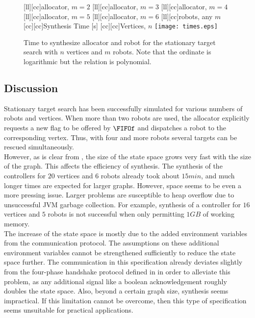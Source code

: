 \begin{figure}
\centering
	[ll][cc]{\footnotesize{allocator, $m=2$}}
	[ll][cc]{\footnotesize{allocator, $m=3$}}
	[ll][cc]{\footnotesize{allocator, $m=4$}}
	[ll][cc]{\footnotesize{allocator, $m=5$}}
	[ll][cc]{\footnotesize{allocator, $m=6$}}
	[ll][cc]{\footnotesize{robots, any $m$}}
	[cc][cc]{\footnotesize{Synthesis Time [s]}}
	[cc][cc]{\footnotesize{Vertices, $n$}}
	\texttt{[image: times.eps]}
\caption{Time to synthesize allocator and robot for the stationary target search with $n$ vertices and $m$ robots. Note that the ordinate is logarithmic but the relation is polynomial.}
\label{fig:stattime}
\end{figure}





\subsection{Discussion}

Stationary target search has been successfully simulated for various numbers of robots and vertices. When more than two robots are used, the allocator explicitly requests a new flag to be offered by $\FIFOf$ and dispatches a robot to the corresponding vertex. Thus, with four and more robots several targets can be rescued simultaneously.\\

However, as is clear from , the size of the state space grows very fast with the size of the graph. This affects the efficiency of synthesis. The synthesis of the controllers for $20$ vertices and $6$ robots already took about $15\unit{min}$, and much longer times are expected for larger graphs. However, space seems to be even a more pressing issue. Larger problems are susceptible to heap overflow due to unsuccessful JVM garbage collection. For example, synthesis of a controller for $16$ vertices and $5$ robots is not successful when only permitting $1\unit{GB}$ of working memory.\\

The increase of the state space is mostly due to the added environment variables from the communication protocol. The assumptions on these additional environment variables cannot be strengthened sufficiently to reduce the state space further. The communication in this specification already deviates slightly from the four-phase handshake protocol defined in  in order to alleviate this problem, as any additional signal like a boolean acknowledgement roughly doubles the state space. Also, beyond a certain graph size, synthesis seems impractical. If this limitation cannot be overcome, then this type of specification seems unsuitable for practical applications.\\


